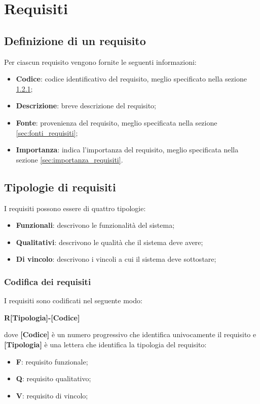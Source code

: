 \section{Requisiti}
\subsection{Definizione di un requisito}
Per ciascun requisito vengono fornite le seguenti informazioni:
\begin{itemize}
	\item \textbf{Codice}: codice identificativo del requisito, meglio specificato nella sezione \ref{sec:codifica_requisiti};
	\item \textbf{Descrizione}: breve descrizione del requisito;
	\item \textbf{Fonte}: provenienza del requisito, meglio specificata nella sezione \ref{sec:fonti_requisiti};
	\item \textbf{Importanza}: indica l'importanza del requisito, meglio specificata nella sezione \ref{sec:importanza_requisiti}.
\end{itemize}

\subsection{Tipologie di requisiti}
I requisiti possono essere di quattro tipologie:
\begin{itemize}
	\item \textbf{Funzionali}: descrivono le funzionalità del sistema;
	\item \textbf{Qualitativi}: descrivono le qualità che il sistema deve avere;
	\item \textbf{Di vincolo}: descrivono i vincoli a cui il sistema deve sottostare;
\end{itemize}

\subsubsection{Codifica dei requisiti}
\label{sec:codifica_requisiti}
I requisiti sono codificati nel seguente modo:
\begin{center}
	\textbf{R[Tipologia]-[Codice]}
\end{center}
dove \textbf{[Codice]} è un numero progressivo che identifica univocamente il requisito
e \textbf{[Tipologia]} è una lettera che identifica la tipologia del requisito:
\begin{itemize}
	\item \textbf{F}: requisito funzionale;
	\item \textbf{Q}: requisito qualitativo;
	\item \textbf{V}: requisito di vincolo;
\end{itemize}

